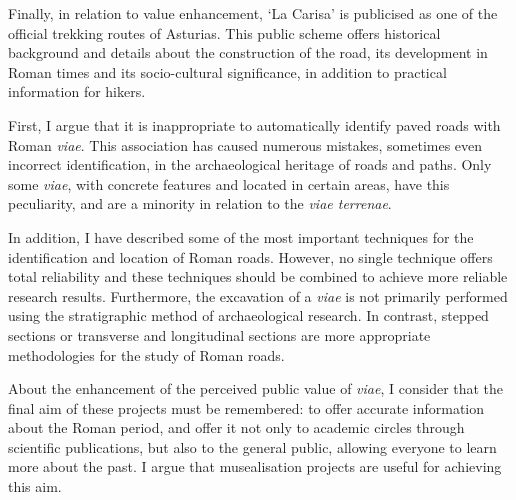 Finally, in relation to value enhancement, ‘La Carisa’ is publicised as one of the official trekking routes of Asturias. This public scheme offers historical background and details about the construction of the road, its development in Roman times and its socio-cultural significance, in addition to practical information for hikers.



First, I argue that it is inappropriate to automatically identify paved roads with Roman \textit{viae}. This association has caused numerous mistakes, sometimes even incorrect identification, in the archaeological heritage of roads and paths. Only some \textit{viae}, with concrete features and located in certain areas, have this peculiarity, and are a minority in relation to the \textit{viae terrenae}.
 
In addition, I have described some of the most important techniques for the identification and location of Roman roads. However, no single technique offers total reliability and these techniques should be combined to achieve more reliable research results. Furthermore, the excavation of a \textit{viae} is not primarily performed using the stratigraphic method of archaeological research. In contrast, stepped sections or transverse and longitudinal sections are more appropriate methodologies for the study of Roman roads.


About the enhancement of the perceived public value of \textit{viae}, I consider that the final aim of these projects must be remembered: to offer accurate information about the Roman period, and offer it not only to academic circles through scientific publications, but also to the general public, allowing everyone to learn more about the past. I argue that musealisation projects are useful for achieving this aim. 

